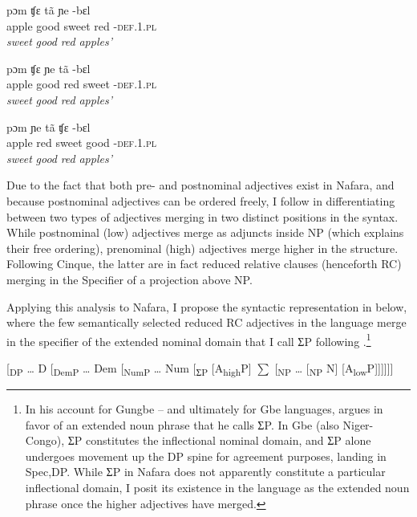 \documentclass[output=paper]{langscibook}
\begin{document}
\ex
\gll   pɔm     ʧɛ   tã     ɲe    -bɛl   \\
apple    good  sweet     red    -\textsc{def.1.pl}\\
 \textit{sweet} \textit{good} \textit{red} \textit{apples’}



\ex
\gll   pɔm     ʧɛ   ɲe    tã     -bɛl    \\
apple    good  red    sweet     -\textsc{def.1.pl}\\
 \textit{sweet} \textit{good} \textit{red} \textit{apples’}



\ex
\gll   pɔm     ɲe  tã     ʧɛ     -bɛl     \\
apple    red  sweet     good    -\textsc{def.1.pl}\\
 \textit{sweet} \textit{good} \textit{red} \textit{apples’}
\z
\z

Due to the fact that both pre- and postnominal adjectives exist in Nafara, and because postnominal adjectives can be ordered freely, I follow \citet{Cinque2010} in differentiating between two types of adjectives merging in two distinct positions in the syntax. While postnominal (low) adjectives merge as adjuncts inside NP (which explains their free ordering), prenominal (high) adjectives merge higher in the structure. Following Cinque, the latter are in fact reduced relative clauses (henceforth RC) merging in the Specifier of a projection above NP.

Applying this analysis to Nafara, I propose the syntactic representation in  below, where the few semantically selected reduced RC adjectives in the language merge in the specifier of the extended nominal domain that I call ƩP following \citet{Aboh2004}.\footnote{In his account for Gungbe – and ultimately for Gbe languages, \citet{Aboh2004} argues in favor of an extended noun phrase that he calls ƩP. In Gbe (also Niger-Congo), ƩP constitutes the inflectional nominal domain, and ƩP alone undergoes movement up the DP spine for agreement purposes, landing in Spec,DP. While ƩP in Nafara does not apparently constitute a particular inflectional domain, I posit its existence in the language as the extended noun phrase once the higher adjectives have merged.}

\ea\label{ex:baron:13}
[\textsubscript{DP} … D [\textsubscript{DemP} … Dem [\textsubscript{NumP} … Num [\textsubscript{ƩP} [A\textsubscript{high}P] ${\sum}$ [\textsubscript{NP} … [\textsubscript{NP} N] [A\textsubscript{low}P]]]]]]
\z
\end{document}
